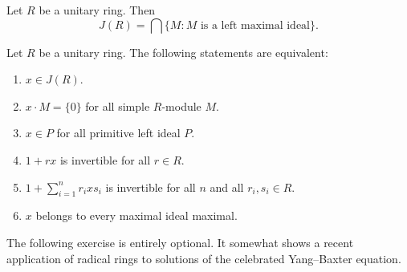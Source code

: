 \begin{exercise}
	Let $R$ be a unitary ring. Then  
	\[
	J(R)=\bigcap\{M:\text{$M$ is a left maximal ideal}\}.
	\]
\end{exercise}

\begin{exercise}
\label{xca:Jcon1}
	Let $R$ be a unitary ring. The
	following statements are equivalent: 
	\begin{enumerate}
		\item $x\in J(R)$.
		\item $x\cdot M=\{0\}$ for all simple $R$-module $M$.
		\item $x\in P$ for all primitive left ideal $P$.
		\item $1+rx$ is invertible for all $r\in R$.
		\item $1+\sum_{i=1}^n r_ixs_i$ is invertible 
		    for all $n$ and all $r_i,s_i\in R$.
		\item $x$ belongs to every maximal ideal maximal. 
	\end{enumerate}
\end{exercise}

The following exercise is entirely optional. 
It somewhat shows a recent application of radical rings
to solutions of the celebrated Yang--Baxter equation. 

